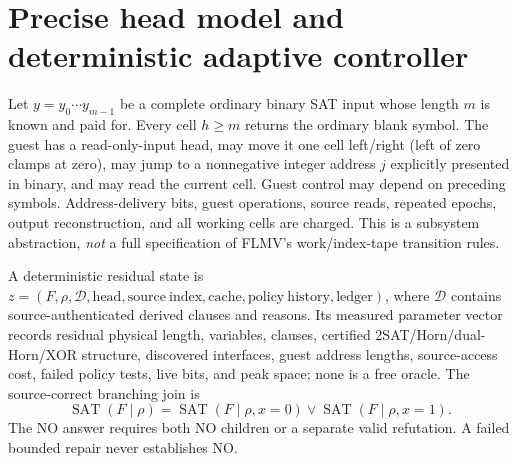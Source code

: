 \documentclass[11pt]{article}
\begin{document}
\section{Precise head model and deterministic adaptive controller}
Let $y=y_0\cdots y_{m-1}$ be a complete ordinary binary SAT input whose length $m$ is known and paid for. Every cell $h\ge m$ returns the ordinary blank symbol. The guest has a read-only-input head, may move it one cell left/right (left of zero clamps at zero), may jump to a nonnegative integer address $j$ explicitly presented in binary, and may read the current cell. Guest control may depend on preceding symbols. Address-delivery bits, guest operations, source reads, repeated epochs, output reconstruction, and all working cells are charged. This is a subsystem abstraction, \emph{not} a full specification of FLMV's work/index-tape transition rules.

A deterministic residual state is $z=(F,\rho,\mathcal D,\mathrm{head},\mathrm{source\ index},\mathrm{cache},\mathrm{policy\ history},\mathrm{ledger})$, where $\mathcal D$ contains source-authenticated derived clauses and reasons. Its measured parameter vector records residual physical length, variables, clauses, certified 2SAT/Horn/dual-Horn/XOR structure, discovered interfaces, guest address lengths, source-access cost, failed policy tests, live bits, and peak space; none is a free oracle. The source-correct branching join is
\[
\operatorname{SAT}(F\mid \rho)=
\operatorname{SAT}(F\mid\rho,x=0)\lor
\operatorname{SAT}(F\mid\rho,x=1).
\]
The NO answer requires both NO children or a separate valid refutation. A failed bounded repair never establishes NO.
\end{document}
